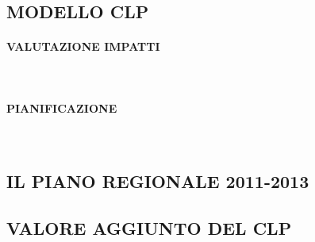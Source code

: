 \documentclass[12pt,a4paper,openright,twoside]{report}
\newcommand{\myparagraph}[1]{\paragraph{#1}\mbox{}\\}
\begin{document}
\subsection{MODELLO CLP}

\myparagraph{VALUTAZIONE IMPATTI}

\myparagraph{PIANIFICAZIONE}

\subsection{IL PIANO REGIONALE 2011-2013}

\subsection{VALORE AGGIUNTO DEL CLP}



\nocite{*}


\end{document}
